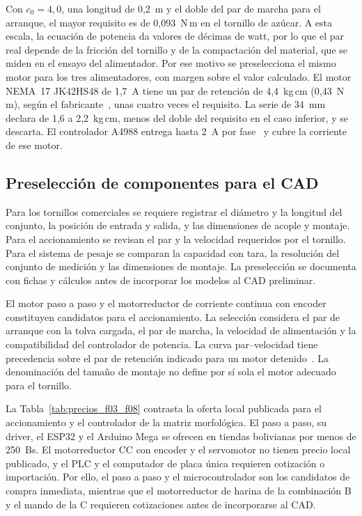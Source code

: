 Con $c_{0} = 4{,}0$, una longitud de 0,2~m y el doble del par de marcha
para el arranque, el mayor requisito es de 0,093~N\,m en el tornillo de
azúcar. A esta escala, la ecuación de potencia da valores de décimas de
watt, por lo que el par real depende de la fricción del tornillo y de la
compactación del material, que se miden en el ensayo del alimentador. Por
ese motivo se preselecciona el mismo motor para los tres alimentadores,
con margen sobre el valor calculado. El motor NEMA~17 JK42HS48 de 1,7~A
tiene un par de retención de 4,4~kg\,cm (0,43~N\,m), según el
fabricante~\parencite{jkongmotor2026nema17}, unas cuatro veces el
requisito. La serie de 34~mm declara de 1,6 a 2,2~kg\,cm, menos del doble
del requisito en el caso inferior, y se descarta. El controlador A4988
entrega hasta 2~A por fase~\parencite{allegro2014a4988} y cubre la corriente
de ese motor.

\subsection{Preselección de componentes para el CAD}

Para los tornillos comerciales se requiere registrar el diámetro y la
longitud del conjunto, la posición de entrada y salida, y las dimensiones
de acople y montaje. Para el accionamiento se revisan el par y la
velocidad requeridos por el tornillo. Para el sistema de pesaje se
comparan la capacidad con tara, la resolución del conjunto de medición y
las dimensiones de montaje. La preselección se documenta con fichas y
cálculos antes de incorporar los modelos al CAD preliminar.

El motor paso a paso y el motorreductor de corriente continua con
encoder constituyen candidatos para el accionamiento. La selección
considera el par de arranque con la tolva cargada, el par de marcha, la
velocidad de alimentación y la compatibilidad del controlador de
potencia. La curva par--velocidad tiene precedencia sobre el par de
retención indicado para un motor detenido~\parencite{orientalStepperSpec}.
La denominación del tamaño de montaje no define por sí sola el motor
adecuado para el tornillo.

La Tabla~\ref{tab:precios_f03_f08} contrasta la oferta local publicada
para el accionamiento y el controlador de la matriz morfológica. El paso a paso, su driver, el
ESP32 y el Arduino Mega se ofrecen en tiendas bolivianas por menos de
250~Bs. El motorreductor CC con encoder y el servomotor no tienen precio
local publicado, y el PLC y el computador de placa única requieren
cotización o importación. Por ello, el paso a paso y el
microcontrolador son los candidatos de compra inmediata, mientras que el
motorreductor de harina de la combinación B y el mando de la C requieren
cotizaciones antes de incorporarse al CAD.


